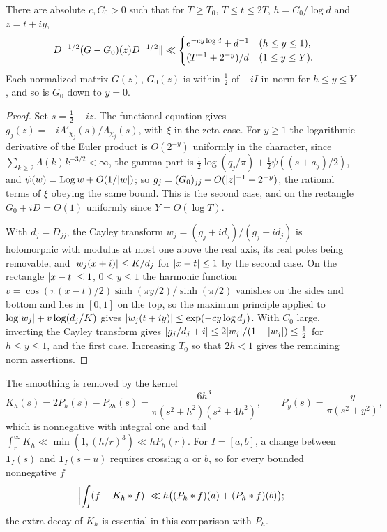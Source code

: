 \begin{lemma}\label{zer:lem:strip}
There are absolute $c,C_0>0$ such that for $T\ge T_0$, $T\le t\le2T$, $h=C_0/\log d$ and $z=t+iy$,
\[
 \lVert D^{-1/2}(G-G_0)(z)D^{-1/2}\rVert\ll\begin{cases}e^{-cy\log d}+d^{-1}&(h\le y\le1),\\(T^{-1}+2^{-y})/d&(1\le y\le Y).\end{cases}
\]
Each normalized matrix $G(z)$, $G_0(z)$ is within $\tfrac12$ of $-iI$ in norm for $h\le y\le Y$, and so is
$G_0$ down to $y=0$.
\end{lemma}
\begin{proof}
Set $s=\tfrac12-iz$. The functional equation gives $g_j(z)=-i\Lambda'_{\overline\chi_j}(s)/\Lambda_{\overline\chi_j}(s)$, with
$\xi$ in the zeta case. For $y\ge1$ the logarithmic derivative of the Euler product is $O(2^{-y})$ uniformly
in the character, since $\sum_{k\ge2}\Lambda(k)k^{-3/2}<\infty$, the gamma part is
$\tfrac12\log(q_j/\pi)+\tfrac12\psi((s+a_j)/2)$, and $\psi(w)=\operatorname{Log} w+O(1/\lvert w\rvert)$; so
$g_j=(G_0)_{jj}+O(\lvert z\rvert^{-1}+2^{-y})$, the rational terms of $\xi$ obeying the same bound. This is the second
case, and on the rectangle $G_0+iD=O(1)$ uniformly since $Y=O(\log T)$.

With $d_j=D_{jj}$, the Cayley transform $w_j=(g_j+id_j)/(g_j-id_j)$ is holomorphic with modulus at most one above
the real axis, its real poles being removable, and $\lvert w_j(x+i)\rvert\le K/d_j$ for $\lvert x-t\rvert\le1$ by the
second case. On the rectangle $\lvert x-t\rvert\le1$, $0\le y\le1$ the harmonic function
$v=\cos(\pi(x-t)/2)\sinh(\pi y/2)/\sinh(\pi/2)$ vanishes on the sides and bottom and lies in $[0,1]$ on the top,
so the maximum principle applied to $\log\lvert w_j\rvert+v\log(d_j/K)$ gives $\lvert w_j(t+iy)\rvert\le\exp(-cy\log d_j)$. With
$C_0$ large, inverting the Cayley transform gives $\lvert g_j/d_j+i\rvert\le2\lvert w_j\rvert/(1-\lvert w_j\rvert)\le\tfrac12$ for
$h\le y\le1$, and the first case. Increasing $T_0$ so that $2h<1$ gives the remaining norm assertions.
\end{proof}

The smoothing is removed by the kernel
\[
 K_h(s)=2P_h(s)-P_{2h}(s)=\frac{6h^3}{\pi(s^2+h^2)(s^2+4h^2)},\qquad P_y(s)=\frac y{\pi(s^2+y^2)},
\]
which is nonnegative with integral one and tail $\int_r^\infty K_h\ll\min(1,(h/r)^3)\ll hP_h(r)$. For
$I=[a,b]$, a change between $\mathbf 1_I(s)$ and $\mathbf 1_I(s-u)$ requires crossing $a$ or $b$, so for every
bounded nonnegative $f$
\begin{equation}\label{zer:eq:clip}
 \Bigl|\int_I(f-K_h*f)\Bigr|\ll h\bigl((P_h*f)(a)+(P_h*f)(b)\bigr);
\end{equation}
the extra decay of $K_h$ is essential in this comparison with $P_h$.

